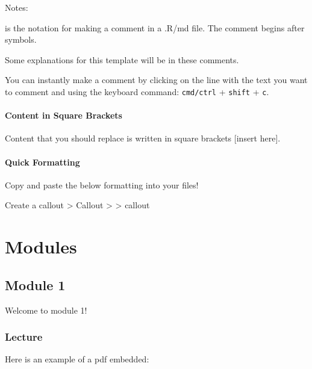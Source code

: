 \documentclass[
]{book}
\begin{document}
Notes:

is the notation for making a comment in a .R/md file. The comment begins after symbols.

Some explanations for this template will be in these comments.

You can instantly make a comment by clicking on the line with the text you want to comment and using the keyboard command: \texttt{cmd/ctrl} + \texttt{shift} + \texttt{c}.

\subsection{Content in Square Brackets}\label{content-in-square-brackets}

Content that you should replace is written in square brackets {[}insert here{]}.

\subsection{Quick Formatting}\label{quick-formatting}

Copy and paste the below formatting into your files!

Create a callout
\textgreater{} Callout
\textgreater{}
\textgreater{} callout

\part{Modules}\label{part-modules}

\chapter{Module 1}\label{module-1}

Welcome to module 1!

\section{Lecture}\label{lecture}

Here is an example of a pdf embedded:
\end{document}
